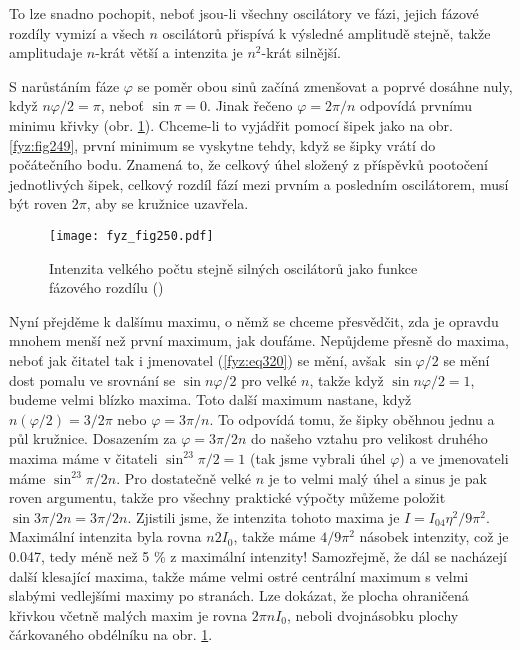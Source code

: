 {    To lze snadno pochopit, neboť jsou-li všechny oscilátory ve fázi, jejich fázové rozdíly vymizí 
    a všech \(n\) oscilátorů přispívá k výsledné amplitudě stejně, takže amplitudaje \(n\)-krát 
    větší a intenzita je \(n^2\)-krát silnější.
    
    S narůstáním fáze \(\varphi\) se poměr obou sinů začíná zmenšovat a poprvé dosáhne nuly, když 
    \(n\varphi/2 = \pi\), neboť \(\sin\pi = 0\). Jinak řečeno \(\varphi = 2\pi/n\) odpovídá prvnímu 
    minimu křivky (obr. \ref{fyz:fig250}). Chceme-li to vyjádřit pomocí šipek jako na obr. 
    \ref{fyz:fig249}, první minimum se vyskytne tehdy, když se šipky vrátí do počátečního bodu. 
    Znamená to, že celkový úhel složený z příspěvků pootočení jednotlivých šipek, celkový rozdíl 
    fází mezi prvním a posledním oscilátorem, musí být roven \(2\pi\), aby se kružnice uzavřela.

    \begin{figure}[ht!] %
      \centering
      \texttt{[image: fyz\_fig250.pdf]}
      \caption{Intenzita velkého počtu stejně silných oscilátorů jako funkce fázového rozdílu
               (\cite[s.~393]{Feynman01})}
      \label{fyz:fig250}
    \end{figure}
    
    Nyní přejděme k dalšímu maximu, o němž se chceme přesvědčit, zda je opravdu mnohem menší než 
    první maximum, jak doufáme. Nepůjdeme přesně do maxima, neboť jak čitatel tak i jmenovatel 
    (\ref{fyz:eq320}) se mění, avšak \(\sin\varphi/2\) se mění dost pomalu ve srovnání se \(\sin 
    n\varphi/2\) pro velké \(n\), takže když \(\sin n\varphi/2 = 1\), budeme velmi blízko maxima. 
    Toto další maximum nastane, když \(n(\varphi/2) = 3/2\pi\) nebo \(\varphi = 3\pi/n\). To 
    odpovídá tomu, že šipky oběhnou jednu a půl kružnice. Dosazením za \(\varphi = 3\pi/2n\) do 
    našeho vztahu pro velikost druhého maxima máme v čitateli \(\sin^23\pi/2 = 1\) (tak jsme 
    vybrali úhel \(\varphi\)) a ve jmenovateli máme \(\sin^23\pi/2n\). Pro dostatečně velké \(n\) 
    je to velmi malý úhel a sinus je pak roven argumentu, takže pro všechny praktické výpočty 
    můžeme položit \(\sin3\pi/2n = 3\pi/2n\). Zjistili jsme, že intenzita tohoto maxima je \(I = 
    I_04η^2/9\pi^2\). Maximální intenzita byla rovna \(n2I_0\), takže máme \(4/9\pi^2\) násobek 
    intenzity, což je \num{0.047}, tedy méně než 5 \% z maximální intenzity! Samozřejmě, že 
    dál se nacházejí další klesající maxima, takže máme velmi ostré centrální maximum s velmi 
    slabými vedlejšími maximy po stranách. Lze dokázat, že plocha ohraničená křivkou včetně malých 
    maxim je rovna \(2\pi nI_0\), neboli dvojnásobku plochy čárkovaného obdélníku na obr. 
    \ref{fyz:fig250}.

}
